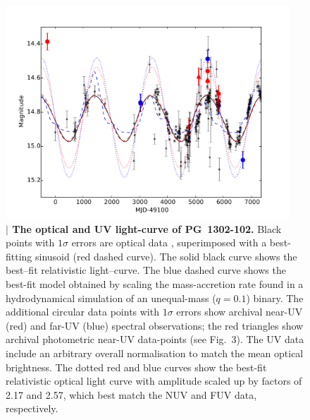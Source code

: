 
\begin{figure}
\centering
\includegraphics[width=0.95\textwidth]{figures/ch4/fig2_Type42.pdf}
\vspace{-15\baselineskip}
\caption{{\bf $\mid$ The optical and UV light-curve of PG~1302-102.}
  Black points with $1\sigma$ errors are optical
  data \cite{Graham+2015a}, superimposed with a best-fitting sinusoid
  (red dashed curve). The solid black curve shows the best--fit
  relativistic light--curve. The blue dashed curve shows the best-fit
  model obtained by scaling the mass-accretion rate found in a
  hydrodynamical simulation of an unequal-mass ($q=0.1$)
  binary\cite{DHM:2013:MNRAS}.  The additional circular data points with
  $1\sigma$ errors show archival near-UV (red) and far-UV (blue)
  spectral observations; the red triangles show archival photometric
  near-UV data-points (see Fig.~3).  The UV data include an arbitrary
  overall normalisation to match the mean optical brightness.  The
  dotted red and blue curves show the best-fit relativistic optical
  light curve with amplitude scaled up by factors of 2.17 and 2.57,
  which best match the NUV and FUV data, respectively.}
\label{fig:lightcurve}
\end{figure}



